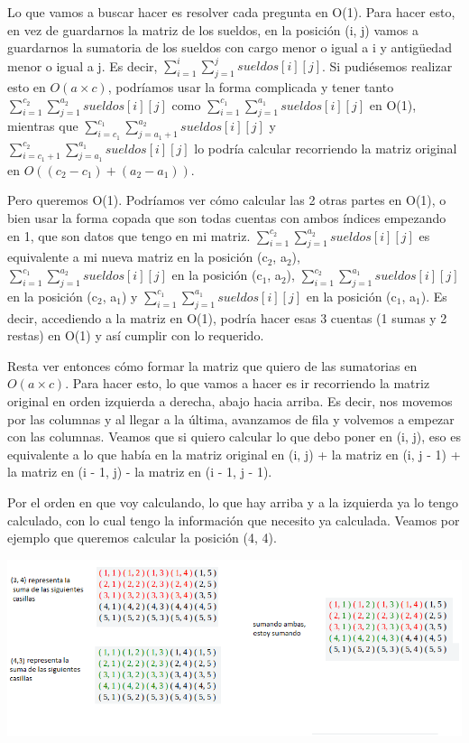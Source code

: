 Lo que vamos a buscar hacer es resolver cada pregunta en O(1). Para hacer esto, en vez de guardarnos la matriz de los sueldos, en la posición (i, j) vamos a guardarnos la sumatoria de los sueldos con cargo menor o igual a i y antigüedad menor o igual a j. Es decir, $\sum_{i = 1}^{i} \sum_{j = 1}^{j} sueldos[i][j]$. Si pudiésemos realizar esto en $O(a \times c)$, podríamos usar la forma complicada y tener tanto $\sum_{i = 1}^{c_2} \sum_{j = 1}^{a_2} sueldos[i][j]$ como $\sum_{i = 1}^{c_1} \sum_{j = 1}^{a_1} sueldos[i][j]$ en O(1), mientras que $\sum_{i = c_1}^{c_1} \sum_{j = a_1 + 1}^{a_2} sueldos[i][j]$ y $\sum_{i = c_1 + 1}^{c_2} \sum_{j = a_1}^{a_1} sueldos[i][j]$ lo podría calcular recorriendo la matriz original en $O((c_2 - c_1) + (a_2 - a_1))$.  \newline

Pero queremos O(1). Podríamos ver cómo calcular las 2 otras partes en O(1), o bien usar la forma copada que son todas cuentas con ambos índices empezando en 1, que son datos que tengo en mi matriz. $\sum_{i = 1}^{c_2} \sum_{j = 1}^{a_2} sueldos[i][j]$ es equivalente a mi nueva matriz en la posición (c$_2$, a$_2$), $\sum_{i = 1}^{c_1} \sum_{j = 1}^{a_2} sueldos[i][j]$ en la posición (c$_1$, a$_2$), $\sum_{i = 1}^{c_2} \sum_{j = 1}^{a_1} sueldos[i][j]$ en la posición (c$_2$, a$_1$) y $\sum_{i = 1}^{c_1} \sum_{j = 1}^{a_1} sueldos[i][j]$ en la posición (c$_1$, a$_1$). Es decir, accediendo a la matriz en O(1), podría hacer esas 3 cuentas (1 sumas y 2 restas) en O(1) y así cumplir con lo requerido.  \newline

Resta ver entonces cómo formar la matriz que quiero de las sumatorias en $O(a \times c)$. Para hacer esto, lo que vamos a hacer es ir recorriendo la matriz original en orden izquierda a derecha, abajo hacia arriba. Es decir, nos movemos por las columnas y al llegar a la última, avanzamos de fila y volvemos a empezar con las columnas. Veamos que si quiero calcular lo que debo poner en (i, j), eso es equivalente a lo que había en la matriz original en (i, j) + la matriz en (i, j - 1) + la matriz en (i - 1, j) - la matriz en (i - 1, j - 1).  \newline

Por el orden en que voy calculando, lo que hay arriba y a la izquierda ya lo tengo calculado, con lo cual tengo la información que necesito ya calculada. Veamos por ejemplo que queremos calcular la posición (4, 4).

\includegraphics[scale=0.5]{img/tabla.jpg}


